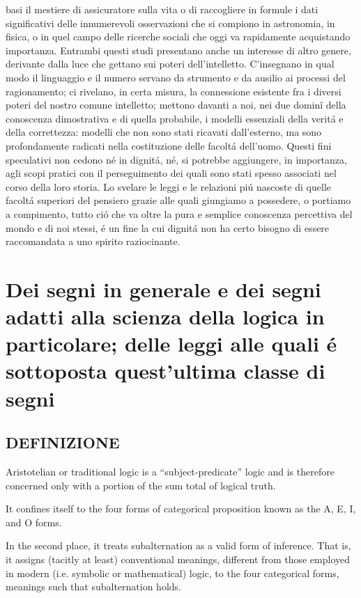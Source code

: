 basi il mestiere di assicuratore sulla vita o di raccogliere in formule i dati significativi delle innumerevoli osservazioni che si compiono in astronomia, in fisica, o in quel campo delle ricerche
sociali che oggi va rapidamente acquistando importanza. Entrambi questi studi presentano anche un interesse di altro genere, derivante dalla luce che gettano sui poteri dell'intelletto.
C'insegnano in qual modo il linguaggio e il numero servano da strumento e da ausilio ai processi del ragionamento; ci rivelano, in certa misura, la connessione esistente fra i diversi
poteri del nostro comune intelletto; mettono davanti a noi, nei due domin\^{i} della conoscenza dimostrativa e di quella probabile, i modelli essenziali della verit\'{a} e della
correttezza: modelli che non sono stati ricavati dall'esterno, ma sono profondamente radicati nella costituzione delle facolt\'{a} dell'uomo. Questi fini speculativi non cedono n\'{e}
in dignit\'{a}, n\'{e}, si potrebbe aggiungere, in importanza, agli scopi pratici con il perseguimento dei quali sono stati spesso associati nel corso della loro storia. Lo svelare le
leggi e le relazioni pi\'{u} nascoste di quelle facolt\'{a} superiori del pensiero grazie alle quali giungiamo a possedere, o portiamo a compimento, tutto ci\'{o} che va oltre la pura
e semplice conoscenza percettiva del mondo e di noi stessi, \'{e} un fine la cui dignit\'{a} non ha certo bisogno di essere raccomandata a uno spirito raziocinante.

\chapter{Dei segni in generale e dei segni adatti alla scienza della logica in particolare; delle leggi alle quali \'{e} sottoposta quest'ultima classe di segni}



\section{DEFINIZIONE}
Aristotelian or traditional logic is a “subject-predicate” logic and is therefore concerned only with a portion of the sum total of logical truth.

It confines itself to the four forms of categorical proposition 
known as the A, E, I, and O forms.

In the second place, it treats subalternation as a valid form of inference. 
That is, it assigns (tacitly at least) conventional meanings, different from those employed in modern 
(i.e. symbolic or mathematical) logic, to the four categorical forms, meanings such that subalternation holds.

